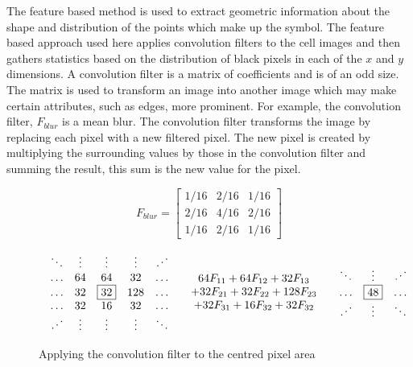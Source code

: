 The feature based method is used to extract geometric information about the shape
and distribution of the points which make up the symbol.
The feature based approach used here applies convolution filters to the
cell images and then gathers statistics based on the distribution of black
pixels in each of the $x$ and $y$ dimensions. A convolution filter is a matrix
of coefficients and is of an odd size. The matrix is used to transform an image into another image
which may make certain attributes, such as edges, more prominent.
For example, the convolution filter, $F_{blur}$ is a mean blur. The convolution filter transforms the image by replacing each pixel
with a new filtered pixel. The new pixel is created by multiplying the surrounding values by those in
the convolution filter and summing the result, this sum is the new value for the pixel.

\[ F_{blur} = \left[
\begin{array}{ccc}
1/16 & 2/16 & 1/16 \\
2/16 & 4/16 & 2/16 \\
1/16 & 2/16 & 1/16
\end{array}\right] \]

\begin{figure}[h] \[
\begin{array}{lcr}
\begin{array}{ccccc}
\ddots & \vdots & \vdots & \vdots & \iddots \\
\ldots & 64 & 64 & 32 & \ldots \\
\ldots & 32 & \fbox{32} & 128 & \ldots \\
\ldots & 32 & 16 & 32 & \ldots \\
\iddots & \vdots & \vdots & \vdots & \ddots \\
\end{array} &
\begin{array}{c}
64F_{11} + 64F_{12} + 32F_{13} \\
+ 32F_{21} + 32F_{22} + 128F_{23} \\
+ 32F_{31} + 16F_{32} + 32F_{32} \\
\end{array} &
\begin{array}{ccccc}
\ddots & \vdots & \iddots \\
\ldots &  \fbox{48}  & \ldots \\
\iddots & \vdots & \ddots \\
\end{array}
\end{array} \]
\caption{Applying the convolution filter to the centred pixel area}
\label{figure:convolution}
\end{figure}

